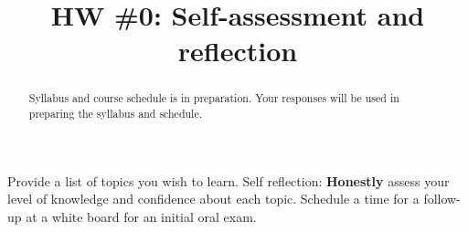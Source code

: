 \documentclass [hw]{exam}
\title{HW \#0: Self-assessment and reflection}
\author{\mobeardInstructorShort}
\date{\printdate{6/10/2021}}
\begin{document}
\maketitle

\begin{abstract}
Syllabus and course schedule is in preparation. Your responses will be used in preparing the syllabus and schedule.
\end{abstract}

\begin{questions}
\question Provide a list of topics you wish to learn.
\question Self reflection: \textbf{Honestly} assess your level of knowledge and confidence about each topic.
\question Schedule a time for a follow-up at a white board for an initial oral exam. 
\end{questions}
\end{document}
